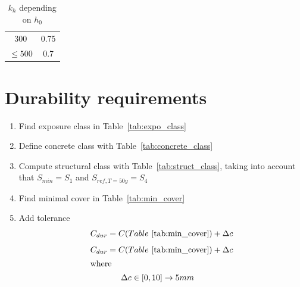 \documentclass[landscape]{article}
\begin{document}
\begin{multicols*}{2}
\begin{table}[H]
\begin{tabular}{cc}
            300 & 0.75 \tabularnewline
            
            $\leq 500$ & 0.7\tabularnewline
            \bottomrule
        \end{tabular}
        \caption{$k_h$ depending on $h_0$}
        \label{tab:k_h}
    \end{table}



\section{Durability requirements} %
\label{sec:durability_requirements}
\begin{enumerate}
  \item Find exposure class in Table~\ref{tab:expo_class}
  \item Define concrete class with Table~\ref{tab:concrete_class}
  \item Compute structural class with Table~\ref{tab:struct_class}, taking into account that $S_{min} =S_1$ and $S_{ref,T=50y}=S_4$
  \item Find minimal cover in Table~\ref{tab:min_cover}
  \item Add tolerance
  \[
    C_{dur} = C(Table~\ref{tab:min_cover}) + \Delta c 
  \]
   \begin{gather}\label{eq:2.1}
        C_{dur} = C(Table~\ref{tab:min_cover}) + \Delta c  \\
        \shortintertext{where}
        \begin{aligned}
          & \Delta c \in [0,10] \rightarrow 5mm 
        \end{aligned}\notag
        \end{gather}
\end{enumerate}


\end{multicols*}
\end{document}
